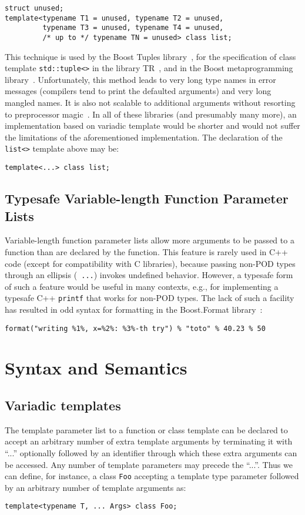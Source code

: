 \documentclass{article}
\begin{document}
\begin{verbatim}
struct unused;
template<typename T1 = unused, typename T2 = unused, 
         typename T3 = unused, typename T4 = unused, 
         /* up to */ typename TN = unused> class list;
\end{verbatim}

This technique is used by the Boost Tuples library~\cite{Tuples01},
for the specification of class template {\tt std::tuple<>} in the
library TR~\cite{Jarvi02}, and in the Boost metaprogramming
library~\cite{Gurtovoy02}. Unfortunately, this method leads to very
long type names in error messages (compilers tend to print the
defaulted arguments) and very long mangled names. It is also not
scalable to additional arguments without resorting to preprocessor
magic~\cite{Preprocessor01}. In all of these libraries (and presumably
many more), an implementation based on variadic template would be
shorter and would not suffer the limitations of the aforementioned
implementation. The declaration of the {\tt list<>} template above may
be:
\begin{verbatim}
template<...> class list;
\end{verbatim}

\subsection{Typesafe Variable-length Function Parameter Lists}
Variable-length function parameter lists allow more arguments to be
passed to a function than are declared by the function. This feature
is rarely used in C++ code (except for compatibility with C
libraries), because passing non-POD types through an ellipsis ({\tt
  ...}) invokes undefined behavior. However, a typesafe form of such a
feature would be useful in many contexts, e.g., for implementing a
typesafe C++ {\tt printf} that works for non-POD types. The lack of
such a facility has resulted in odd syntax for formatting in the
Boost.Format library~\cite{Krempp02}:
\begin{verbatim}
format("writing %1%, x=%2%: %3%-th try") % "toto" % 40.23 % 50
\end{verbatim}

\section{Syntax and Semantics}
\subsection{Variadic templates}
\par The template parameter list to a function or class template can
be declared to accept an arbitrary number of extra template arguments
by terminating it with ``...'' optionally followed by an identifier
through which these extra arguments can be accessed.
Any number of template
parameters may precede the ``...''. Thus we can define, for instance,
a class {\tt Foo} accepting a template type parameter followed by an
arbitrary number of template arguments as:
\begin{verbatim}
template<typename T, ... Args> class Foo;
\end{verbatim}
\end{document}
